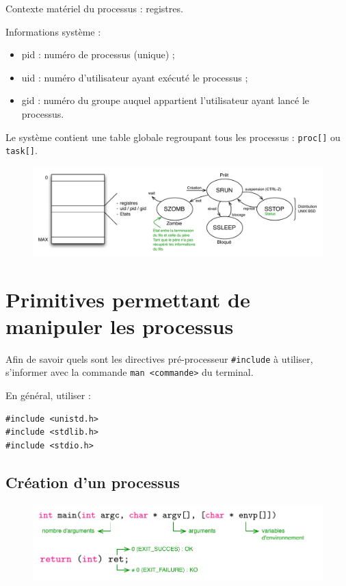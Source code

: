 \documentclass[11pt,english,french]{scrreprt}
\theoremstyle{remark}
\theoremstyle{definition}
\begin{document}
Contexte matériel du processus : registres.

Informations système :\begin{itemize}
	\item pid : numéro de processus (unique) ;
	\item uid : numéro d'utilisateur ayant exécuté le processus ;
	\item gid : numéro du groupe auquel appartient l'utilisateur ayant lancé le processus.
\end{itemize}

Le système contient une table globale regroupant tous les processus : \lstinline!proc[]! ou \lstinline!task[]!.
\begin{figure}[h!]
	\center
	\vspace{-10pt}
	\includegraphics[scale=.65]{img/processus-UNIX}
	\vspace{-20pt}
\end{figure}

\section{Primitives permettant de manipuler les processus} %
Afin de savoir quels sont les directives pré-processeur \lstinline!#include! à utiliser, s'informer avec la commande \lstinline!man <commande>! du terminal.

En général, utiliser :
\begin{lstlisting}
#include <unistd.h>
#include <stdlib.h>
#include <stdio.h>
\end{lstlisting}

\subsection{Création d'un processus} %
\begin{figure}[h!]
	\center
	\vspace{-10pt}
	\includegraphics[scale=.75]{img/main}
\end{figure}
\end{document}
